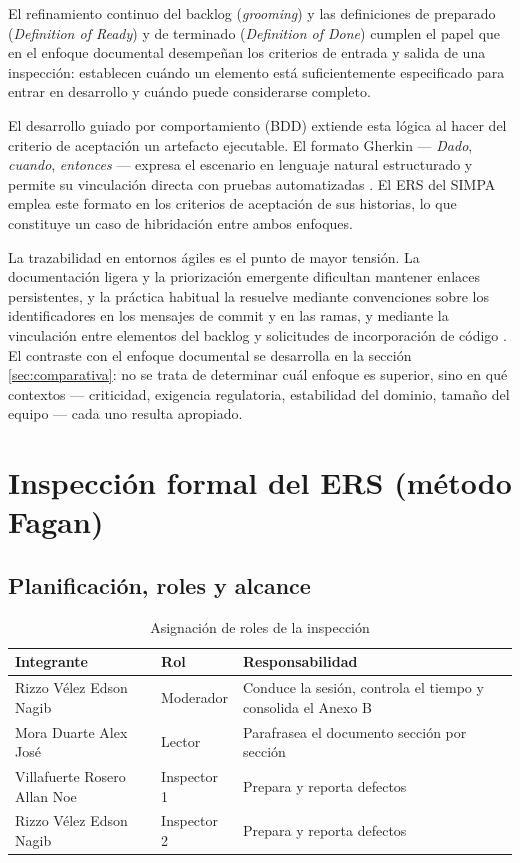 \documentclass[11pt,letterpaper]{article}
\begin{document}
El refinamiento continuo del backlog (\emph{grooming}) y las definiciones de preparado
(\emph{Definition of Ready}) y de terminado (\emph{Definition of Done}) cumplen el papel que en el
enfoque documental desempeñan los criterios de entrada y salida de una inspección: establecen cuándo
un elemento está suficientemente especificado para entrar en desarrollo y cuándo puede considerarse
completo.

El desarrollo guiado por comportamiento (BDD) extiende esta lógica al hacer del criterio de
aceptación un artefacto ejecutable. El formato Gherkin --- \emph{Dado}, \emph{cuando},
\emph{entonces} --- expresa el escenario en lenguaje natural estructurado y permite su vinculación
directa con pruebas automatizadas \cite{smart2014}. El ERS del SIMPA emplea este formato en los
criterios de aceptación de sus historias, lo que constituye un caso de hibridación entre ambos
enfoques.

La trazabilidad en entornos ágiles es el punto de mayor tensión. La documentación ligera y la
priorización emergente dificultan mantener enlaces persistentes, y la práctica habitual la resuelve
mediante convenciones sobre los identificadores en los mensajes de commit y en las ramas, y mediante
la vinculación entre elementos del backlog y solicitudes de incorporación de código
\cite{clelandhuang2012}. El contraste con el enfoque documental se desarrolla en la
sección \ref{sec:comparativa}: no se trata de determinar cuál enfoque es superior, sino en qué
contextos --- criticidad, exigencia regulatoria, estabilidad del dominio, tamaño del equipo --- cada
uno resulta apropiado.

\section{Inspección formal del ERS (método Fagan)}
\label{sec:inspeccion}

\subsection{Planificación, roles y alcance}

\begin{table}[H]
\centering
\caption{Asignación de roles de la inspección}
\begin{tabular}{L{4.5cm} L{3.5cm} L{5cm}}
\toprule
\textbf{Integrante} & \textbf{Rol} & \textbf{Responsabilidad}\\
\midrule
Rizzo Vélez Edson Nagib & Moderador & Conduce la sesión, controla el tiempo y consolida el Anexo B\\
Mora Duarte Alex José & Lector & Parafrasea el documento sección por sección\\
Villafuerte Rosero Allan Noe & Inspector 1 & Prepara y reporta defectos\\
Rizzo Vélez Edson Nagib & Inspector 2 & Prepara y reporta defectos\\
\bottomrule
\end{tabular}
\end{table}
\end{document}
